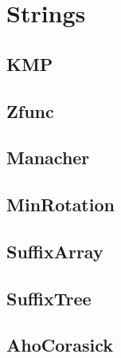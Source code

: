 \chapter{Strings}

\section{KMP}
\section{Zfunc}
\section{Manacher}
\section{MinRotation}
\section{SuffixArray}
\section{SuffixTree}
\section{AhoCorasick}
